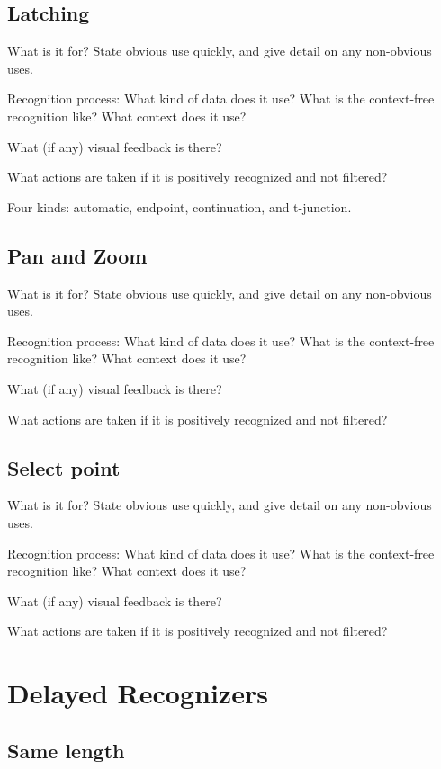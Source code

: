 \begin{samepage}
\begin{samepage}
\subsection{Latching}

What is it for? State obvious use quickly, and give detail on any
non-obvious uses.

Recognition process: What kind of data does it use? What is the
context-free recognition like? What context does it use?

What (if any) visual feedback is there?

What actions are taken if it is positively recognized and not
filtered?

Four kinds: automatic, endpoint, continuation, and t-junction.

\subsection{Pan and Zoom}

What is it for? State obvious use quickly, and give detail on any
non-obvious uses.

Recognition process: What kind of data does it use? What is the
context-free recognition like? What context does it use?

What (if any) visual feedback is there?

What actions are taken if it is positively recognized and not
filtered?

\subsection{Select point}

What is it for? State obvious use quickly, and give detail on any
non-obvious uses.

Recognition process: What kind of data does it use? What is the
context-free recognition like? What context does it use?

What (if any) visual feedback is there?

What actions are taken if it is positively recognized and not
filtered?

\section{Delayed Recognizers}

\subsection{Same length}


\end{samepage}
\end{samepage}
